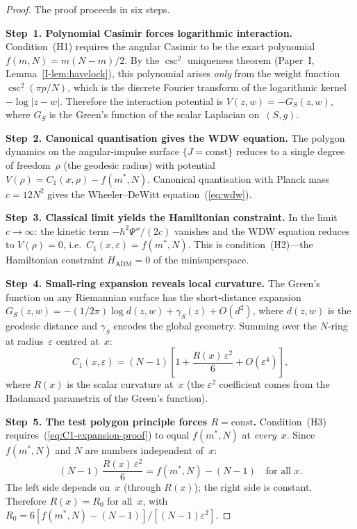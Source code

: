 \begin{proof}
The proof proceeds in six steps.

\medskip
\noindent\textbf{Step~1. Polynomial Casimir forces logarithmic interaction.}
Condition~(H1) requires the angular Casimir
to be the exact polynomial $f(m,N) = m(N{-}m)/2$.
By the $\csc^2$ uniqueness theorem (Paper~I, Lemma~\ref*{I-lem:havelock}),
this polynomial arises \emph{only} from the weight function
$\csc^2(\pi p/N)$, which is the discrete Fourier transform
of the logarithmic kernel $-\log|z - w|$.
Therefore the interaction potential is
$V(z,w) = -G_S(z,w)$, where $G_S$ is the Green's function
of the scalar Laplacian on~$(S, g)$.

\medskip
\noindent\textbf{Step~2. Canonical quantisation gives the WDW equation.}
The polygon dynamics on the angular-impulse surface
$\{J = \mathrm{const}\}$ reduces to a single degree of freedom~$\rho$
(the geodesic radius) with potential
$V(\rho) = C_1(x,\rho) - f(m^*,N)$.
Canonical quantisation with Planck mass $c = 12N^2$ gives the
Wheeler--DeWitt equation~(\ref{eq:wdw}).

\medskip
\noindent\textbf{Step~3. Classical limit yields the Hamiltonian constraint.}
In the limit $c \to \infty$: the kinetic term
$-\hbar^2\Psi''/(2c)$ vanishes and the WDW equation reduces to
$V(\rho) = 0$, i.e.\ $C_1(x,\varepsilon) = f(m^*,N)$.
This is condition~(H2)---the Hamiltonian constraint
$H_{\mathrm{ADM}} = 0$ of the minisuperspace.

\medskip
\noindent\textbf{Step~4. Small-ring expansion reveals local curvature.}
The Green's function on any Riemannian surface has the short-distance
expansion $G_S(z,w) = -(1/2\pi)\log d(z,w) + \gamma_S(z) + O(d^2)$,
where $d(z,w)$ is the geodesic distance and $\gamma_S$ encodes
the global geometry.
Summing over the $N$-ring at radius~$\varepsilon$ centred at~$x$:
\begin{equation}\label{eq:C1-expansion-proof}
  C_1(x, \varepsilon)
  = (N{-}1)\!\left[1 + \frac{R(x)\,\varepsilon^2}{6}
    + O(\varepsilon^4)\right],
\end{equation}
where $R(x)$ is the scalar curvature at~$x$
(the $\varepsilon^2$ coefficient comes from the Hadamard
parametrix of the Green's function).

\medskip
\noindent\textbf{Step~5. The test polygon principle forces $R = \mathrm{const}$.}
Condition~(H3) requires~(\ref{eq:C1-expansion-proof}) to equal
$f(m^*,N)$ at \emph{every}~$x$.
Since $f(m^*,N)$ and $N$ are numbers independent of~$x$:
\[
  (N{-}1)\,\frac{R(x)\,\varepsilon^2}{6}
  = f(m^*,N) - (N{-}1) \quad\text{for all } x.
\]
The left side depends on~$x$ (through $R(x)$);
the right side is constant.
Therefore $R(x) = R_0$ for all~$x$, with
$R_0 = 6[f(m^*,N) - (N{-}1)]/[(N{-}1)\varepsilon^2]$.


\end{proof}
